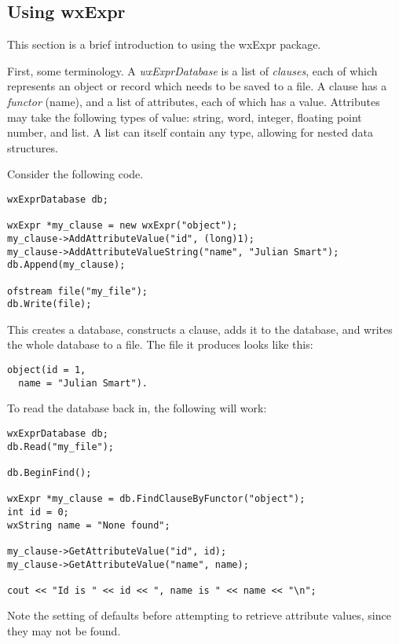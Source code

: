 \subsection{Using wxExpr}

This section is a brief introduction to using the wxExpr package.

First, some terminology.  A {\it wxExprDatabase}\/ is a list of {\it clauses},
each of which represents an object or record which needs to be saved to a file.
A clause has a {\it functor}\/ (name), and a list of attributes, each of which
has a value.  Attributes may take the following types of value: string, word,
integer, floating point number, and list.  A list can itself contain any
type, allowing for nested data structures.

Consider the following code.

\begin{verbatim}
wxExprDatabase db;

wxExpr *my_clause = new wxExpr("object");
my_clause->AddAttributeValue("id", (long)1);
my_clause->AddAttributeValueString("name", "Julian Smart");
db.Append(my_clause);

ofstream file("my_file");
db.Write(file);
\end{verbatim}

This creates a database, constructs a clause, adds it to the database,
and writes the whole database to a file.  The file it produces looks like
this:

\begin{verbatim}
object(id = 1,
  name = "Julian Smart").
\end{verbatim}

To read the database back in, the following will work:

\begin{verbatim}
wxExprDatabase db;
db.Read("my_file");

db.BeginFind();

wxExpr *my_clause = db.FindClauseByFunctor("object");
int id = 0;
wxString name = "None found";

my_clause->GetAttributeValue("id", id);
my_clause->GetAttributeValue("name", name);

cout << "Id is " << id << ", name is " << name << "\n";
\end{verbatim}

Note the setting of defaults before attempting to retrieve attribute values,
since they may not be found.

